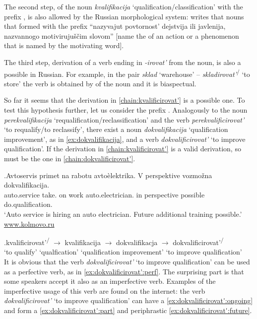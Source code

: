 The second step,  of the noun \textit{kvalifikacija} `qualification\slash classifica\-tion' with the prefix , is also allowed by the Russian morphological system: \citet[226]{Shvedova:82} writes that nouns that formed with the prefix  ``nazyvajut povtornost' dejstvija ili javlenija, nazvannogo motiviruju\v{s}\v{c}im slovom'' [name the  of an action or a phenomenon that is named by the motivating word].

The third step, derivation of a verb ending in \textit{-irovat'} from the noun, is also a possible  in Russian. For example, in the pair \textit{sklad} `warehouse' -- \textit{skladirovat'}\textsuperscript{\PF\slash\IPF} `to store' the verb is obtained by  of the noun and it is biaspectual.

So far it seems that the derivation in \ref{chain:kvalificirovat'} is a possible one. To test this hypothesis further, let us consider the  prefix . Analogously to the noun \textit{perekvalifikacija} `requalification/reclassification' and the verb \textit{perekvalificirovat'} `to requalify/to reclassify', there exist a noun \textit{dokvalifikacija} `qualification improvement', as in \ref{ex:dokvalifikacija}, and a verb \textit{dokvalificirovat'} `to improve qualification'. If the derivation in \ref{chain:kvalificirovat'} is a valid derivation, so must be the one in \ref{chain:dokvalificirovat'}.

\exg.\label{ex:dokvalifikacija}Avtoservis primet na rabotu avto\`{e}lektrika. V perspektive vozmo\v{z}na dokvalifikacija.\\
{auto.service} take. on work {auto.electrician.} in perspective possible do.qualification.\\
\trans `Auto service is hiring an auto electrician. Future additional training possible.' \hfill\hbox{\url{www.kolmovo.ru}}

\exg.\label{chain:dokvalificirovat'}kvalificirovat'\textsuperscript{\PF\slash\IPF} {$\rightarrow$} kvalifikacija {$\rightarrow$} dokvalifikacja {$\rightarrow$} dokvalificirovat'\textsuperscript{\PF\slash\IPF}\\
{`to qualify'} {} {`qualfication'} {} {`qualification improvement'} {} {`to improve qualification'}\\

It is obvious that the verb \textit{dokvalificirovat'} `to improve qualification' can be used as a perfective verb, as in \ref{ex:dokvalificirovat':perf}. The surprising part is that some speakers accept it also as an imperfective verb. Examples of the imperfective usage of this verb are found on the internet: the verb \textit{dokvalificirovat'} `to improve qualification' can have a  \ref{ex:dokvalificirovat':ongoing} and form a  \ref{ex:dokvalificirovat':part} and periphrastic  \ref{ex:dokvalificirovat':future}. 

